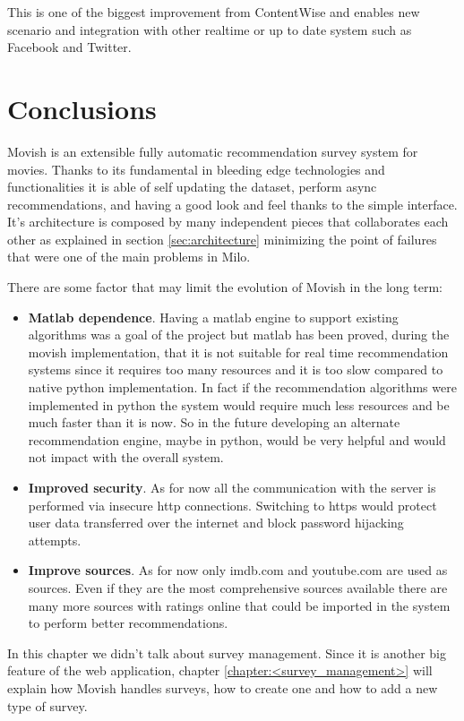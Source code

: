 This is one of the biggest improvement from ContentWise \cite{ContentWise} and enables new scenario and integration with other realtime or up to date system such as Facebook and Twitter.

\section{Conclusions}
\label{sec:movish_system_conclusions}

Movish is an extensible fully automatic recommendation survey system for movies. Thanks to its fundamental in bleeding edge technologies and functionalities it is able of self updating the dataset, perform async recommendations, and having a good look and feel thanks to the simple interface. It's architecture is composed by many independent pieces that collaborates each other as explained in section \ref{sec:architecture} minimizing the point of failures that were one of the main problems in Milo. 

There are some factor that may limit the evolution of Movish in the long term:

\begin{itemize}
\item \textbf{Matlab dependence}. Having a matlab engine to support existing algorithms was a goal of the project but matlab has been proved, during the movish implementation, that it is not suitable for real time recommendation systems since it requires too many resources and it is too slow compared to native python implementation. In fact if the recommendation algorithms were implemented in python the system would require much less resources and be much faster than it is now. So in the future developing an alternate recommendation engine, maybe in python, would be very helpful and would not impact with the overall system.
\item \textbf{Improved security}. As for now all the communication with the server is performed via insecure http connections. Switching to https would protect user data transferred over the internet and block password hijacking attempts.
\item \textbf{Improve sources}. As for now only imdb.com and youtube.com are used as sources. Even if they are the most comprehensive sources available there are many more sources with ratings online that could be imported in the system to perform better recommendations.
\end{itemize}

In this chapter we didn't talk about survey management. Since it is another big feature of the web application, chapter \ref{chapter:<survey_management>} will explain how Movish handles surveys, how to create one and how to add a new type of survey.

\acresetall